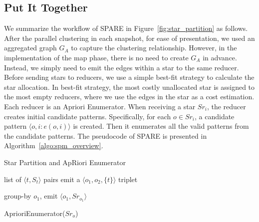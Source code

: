 \subsection{Put It Together}
We summarize the workflow of SPARE in Figure~\ref{fig:star_partition} as follows. After the parallel clustering in each snapshot, for ease of presentation, we used an aggregated graph $G_A$ to capture the clustering relationship. However, in the implementation of the map phase, there is no need to create $G_A$ in advance. Instead, we simply need to emit the edges within a star to the same reducer. Before sending stars to reducers, we use a simple best-fit strategy to calculate the star allocation. In best-fit strategy, the most costly unallocated star is assigned to the most empty reducers, where we use the edges in the star as a cost estimation.
 Each reducer is an Apriori Enumerator. When receiving a star $Sr_i$, the reducer creates initial candidate patterns. Specifically, for each $o \in Sr_i$, a candidate pattern $\langle o,i: e(o,i) \rangle$ is created. Then it enumerates all the valid patterns from the candidate patterns. The pseudocode of SPARE is presented in Algorithm~\ref{algo:spm_overview}. 

\begin{algorithm}
\caption{Star Partition and ApRiori Enumerator}
\label{algo:spm_overview}
\begin{algorithmic}[1]
\Require list of $\langle t, S_t \rangle$ pairs
\label{code:spm-map-start}
	\State emit a $\langle o_1, o_2, \{t\}\rangle$ triplet~\label{code:spm-edge-direct}
	\EndFor
\EndFor
\label{code:spm-map-end}

\label{code:spm-shuffle-start}
	\State group-by $o_1$, emit $\langle o_1, Sr_{o_1} \rangle$ 
\EndFor
\label{code:spm-shuffle-end}

\label{code:spm-reduce-start}
\State AprioriEnumerator($Sr_o$)
\EndFor
\label{code:spm-reduce-end}

\end{algorithmic}
\end{algorithm}

